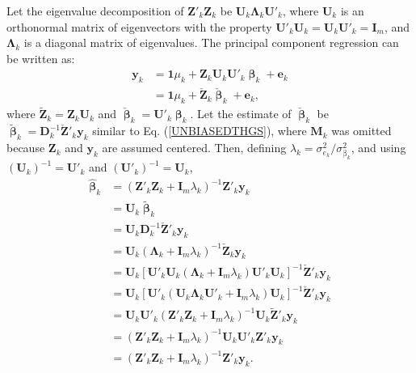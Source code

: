 \documentclass{bmcart}
\begin{document}
Let the eigenvalue decomposition of $\mathbf{Z}'_k\mathbf{Z}_k$ be
$\mathbf{U}_k\mathbf{\Lambda}_k\mathbf{U}'_k$, where $\mathbf{U}_k$ is an orthonormal matrix of eigenvectors with the property $\mathbf{U}'_k\mathbf{U}_k = \mathbf{U}_k\mathbf{U}'_k = \mathbf{I}_m$, and $\mathbf{\Lambda}_k$ is a diagonal matrix of eigenvalues. The principal component regression \cite{StatLearn} can be written as:
\begin{align*}
    \mathbf{y}_k &= \mathbf{1}\mu_k + \mathbf{Z}_k\mathbf{U}_k\mathbf{U}'_k\mathbf{\upbeta}_k + \mathbf{e}_k\\
    &= \mathbf{1}\mu_k +\check{\mathbf{Z}}_k\check{\mathbf{\upbeta}}_k + \mathbf{e}_k,
\end{align*}
where $\tilde{\mathbf{Z}}_k = \mathbf{Z}_k\mathbf{U}_k$ and $\check{\mathbf{\upbeta}}_k = \mathbf{U}'_k\mathbf{\upbeta}_k$. Let the estimate of $\check{\mathbf{\upbeta}}_k$ be $\tilde{\mathbf{\upbeta}}_k = \mathbf{D}^{-1}_k\check{\mathbf{Z}}'_k\mathbf{y}_k$ similar to Eq. (\ref{UNBIASEDTHGS}), where $\mathbf{M}_k$ was omitted because $\mathbf{Z}_k$ and $\mathbf{y}_k$ are assumed centered. Then, defining $\lambda_k = \sigma^2_{e_k}/\sigma^2_{\upbeta_k}$, and using $(\mathbf{U}_k)^{-1} = \mathbf{U}'_k$ and $(\mathbf{U}'_k)^{-1} = \mathbf{U}_k$,
\begin{align*}
    \hat{\mathbf{\upbeta}}_k &= (\mathbf{Z}'_k\mathbf{Z}_k + \mathbf{I}_m\lambda_k)^{-1}\mathbf{Z}'_k\mathbf{y}_k\\
    &= \mathbf{U}_k\tilde{\mathbf{\upbeta}}_k\\
    &= \mathbf{U}_k\mathbf{D}^{-1}_k\check{\mathbf{Z}}'_k\mathbf{y}_k\\
    &= \mathbf{U}_k(\mathbf{\Lambda}_k+\mathbf{I}_m\lambda_k)^{-1}\check{\mathbf{Z}}_k\mathbf{y}_k\\
    &= \mathbf{U}_k[\mathbf{U}'_k\mathbf{U}_k(\mathbf{\Lambda}_k+\mathbf{I}_m\lambda_k)\mathbf{U}'_k\mathbf{U}_k]^{-1}\check{\mathbf{Z}}'_k\mathbf{y}_k\\
    &= \mathbf{U}_k[\mathbf{U}'_k(\mathbf{U}_k\mathbf{\Lambda}_k\mathbf{U}'_k+\mathbf{I}_m\lambda_k)\mathbf{U}_k]^{-1}\check{\mathbf{Z}}'_k\mathbf{y}_k\\
    &= \mathbf{U}_k\mathbf{U}'_k(\mathbf{Z}'_k\mathbf{Z}_k+\mathbf{I}_m\lambda_k)^{-1}\mathbf{U}_k\tilde{\mathbf{Z}}'_k\mathbf{y}_k\\
    &= (\mathbf{Z}'_k\mathbf{Z}_k+\mathbf{I}_m\lambda_k)^{-1}\mathbf{U}_k\mathbf{U}'_k\mathbf{Z}'_k\mathbf{y}_k\\
    &= (\mathbf{Z}'_k\mathbf{Z}_k+\mathbf{I}_m\lambda_k)^{-1}\mathbf{Z}'_k\mathbf{y}_k.
\end{align*}
\end{document}
